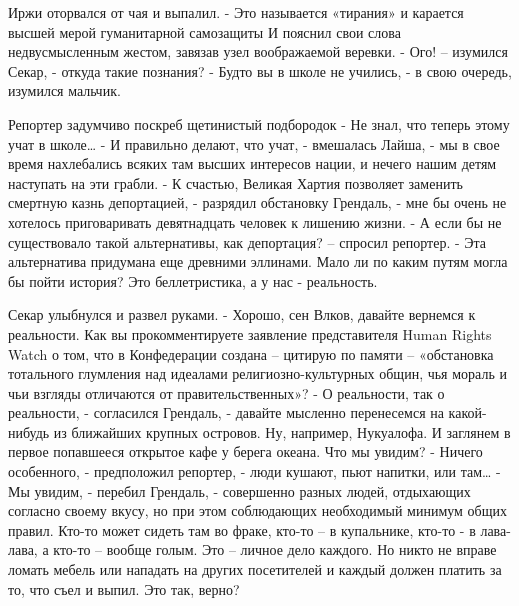 \documentclass{book}
\begin{document}
Иржи оторвался от чая и выпалил.
- Это называется «тирания» и карается высшей мерой гуманитарной самозащиты
И пояснил свои слова недвусмысленным жестом, завязав узел воображаемой веревки.
- Ого! – изумился Секар, - откуда такие познания?
- Будто вы в школе не учились, - в свою очередь, изумился мальчик.

Репортер задумчиво поскреб щетинистый подбородок
- Не знал, что теперь этому учат в школе\ldots{}
- И правильно делают, что учат, - вмешалась Лайша, - мы в свое время нахлебались всяких там высших интересов нации, и нечего нашим детям наступать на эти грабли.
- К счастью, Великая Хартия позволяет заменить смертную казнь депортацией, - разрядил обстановку Грендаль, - мне бы очень не хотелось приговаривать девятнадцать человек к лишению жизни.
- А если бы не существовало такой альтернативы, как депортация? – спросил репортер.
- Эта альтернатива придумана еще древними эллинами. Мало ли по каким путям могла бы пойти история? Это беллетристика, а у нас - реальность.

Секар улыбнулся и развел руками.
- Хорошо, сен Влков, давайте вернемся к реальности. Как вы прокомментируете заявление представителя Human Rights Watch о том, что в Конфедерации создана – цитирую по памяти – «обстановка тотального глумления над идеалами религиозно-культурных общин, чья мораль и чьи взгляды отличаются от правительственных»?
- О реальности, так о реальности, - согласился Грендаль, - давайте мысленно перенесемся на какой-нибудь из ближайших крупных островов. Ну, например, Нукуалофа. И заглянем в первое попавшееся открытое кафе у берега океана. Что мы увидим?
- Ничего особенного, - предположил репортер, - люди кушают, пьют напитки, или там\ldots{}
- Мы увидим, - перебил Грендаль, - совершенно разных людей, отдыхающих согласно своему вкусу, но при этом соблюдающих необходимый минимум общих правил. Кто-то может сидеть там во фраке, кто-то – в купальнике, кто-то - в лава-лава, а кто-то – вообще голым. Это – личное дело каждого. Но никто не вправе ломать мебель или нападать на других посетителей и каждый должен платить за то, что съел и выпил. Это так, верно?
\end{document}
